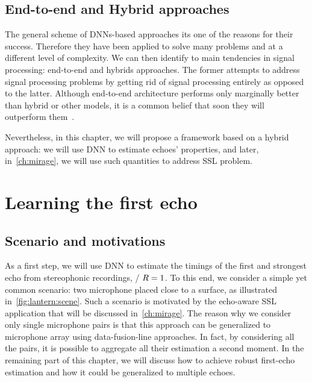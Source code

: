 \subsection{End-to-end and Hybrid approaches}
The general scheme of \acp{DNN}-based approaches its one of the reasons for their success.
Therefore they have been applied to solve many problems and at a different level of complexity.
We can then identify to main tendencies in signal processing: end-to-end and hybrids approaches. The former attempts to address signal processing problems by getting rid of signal processing entirely as opposed to the latter.
Although end-to-end architecture performs only marginally better than hybrid or other models, it is a common belief that soon they will outperform them~.

\mynewline
Nevertheless, in this chapter, we will propose a framework based on a hybrid approach:
we will use \ac{DNN} to estimate echoes' properties, and later, in~\cref{ch:mirage}, we will use such quantities to address \ac{SSL} problem.

\section{Learning the first echo}\label{sec:lantern:simple}

\subsection{Scenario and motivations}
As a first step, we will use \ac{DNN} to estimate the timings of the first and strongest echo from stereophonic recordings, \ie/ $R=1$.
To this end, we consider a simple yet common scenario: two microphone placed close to a surface, as illustrated in~\cref{fig:lantern:scene}.
Such a scenario is motivated by the echo-aware \acf{SSL} application that will be discussed in~\cref{ch:mirage}.
The reason why we consider only single microphone pairs is that this approach can be generalized to microphone array using data-fusion-line approaches.
In fact, by considering all the pairs, it is possible to aggregate all their estimation a second moment.
In the remaining part of this chapter, we will discuss how to achieve robust first-echo estimation and how it could be generalized to multiple echoes.

